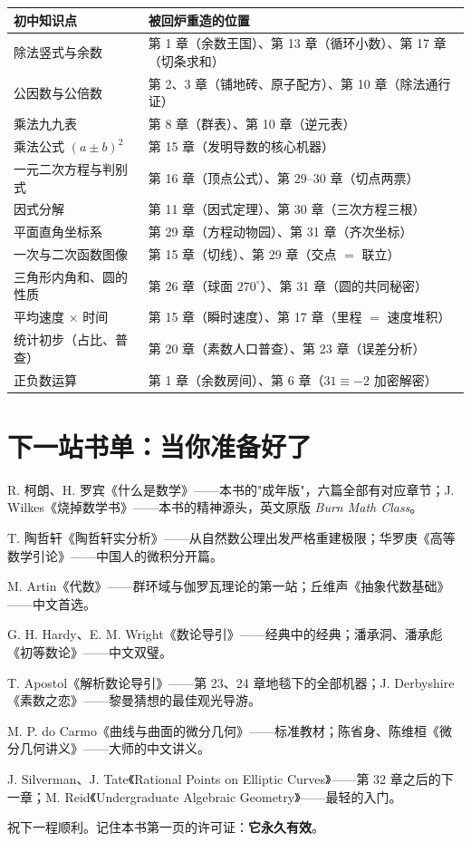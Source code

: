 \begin{center}
\begin{longtable}{p{} p{}}
\toprule
初中知识点 & 被回炉重造的位置 \\
\midrule
\endhead
除法竖式与余数 & 第 1 章（余数王国）、第 13 章（循环小数）、第 17 章（切条求和） \\
公因数与公倍数 & 第 2、3 章（铺地砖、原子配方）、第 10 章（除法通行证） \\
乘法九九表 & 第 8 章（群表）、第 10 章（逆元表） \\
乘法公式 $(a\pm b)^2$ & 第 15 章（发明导数的核心机器） \\
一元二次方程与判别式 & 第 16 章（顶点公式）、第 29--30 章（切点两票） \\
因式分解 & 第 11 章（因式定理）、第 30 章（三次方程三根） \\
平面直角坐标系 & 第 29 章（方程动物园）、第 31 章（齐次坐标） \\
一次与二次函数图像 & 第 15 章（切线）、第 29 章（交点 $=$ 联立） \\
三角形内角和、圆的性质 & 第 26 章（球面 $270^\circ$）、第 31 章（圆的共同秘密） \\
平均速度 $\times$ 时间 & 第 15 章（瞬时速度）、第 17 章（里程 $=$ 速度堆积） \\
统计初步（占比、普查） & 第 20 章（素数人口普查）、第 23 章（误差分析） \\
正负数运算 & 第 1 章（余数房间）、第 6 章（$31 \equiv -2$ 加密解密） \\
\bottomrule
\end{longtable}
\end{center}

\chapter{下一站书单：当你准备好了}

\begin{description}[leftmargin=2em]
  \item[通识再进一步] R. 柯朗、H. 罗宾《什么是数学》——本书的"成年版"，六篇全部有对应章节；J. Wilkes《烧掉数学书》——本书的精神源头，英文原版 \textit{Burn Math Class}。
  \item[分析（篇三的完全体）] T. 陶哲轩《陶哲轩实分析》——从自然数公理出发严格重建极限；华罗庚《高等数学引论》——中国人的微积分开篇。
  \item[代数（篇二的完全体）] M. Artin《代数》——群环域与伽罗瓦理论的第一站；丘维声《抽象代数基础》——中文首选。
  \item[数论（篇一的完全体）] G. H. Hardy、E. M. Wright《数论导引》——经典中的经典；潘承洞、潘承彪《初等数论》——中文双璧。
  \item[解析数论（篇四）] T. Apostol《解析数论导引》——第 23、24 章地毯下的全部机器；J. Derbyshire《素数之恋》——黎曼猜想的最佳观光导游。
  \item[微分几何（篇五）] M. P. do Carmo《曲线与曲面的微分几何》——标准教材；陈省身、陈维桓《微分几何讲义》——大师的中文讲义。
  \item[代数几何与椭圆曲线（篇六）] J. Silverman、J. Tate《Rational Points on Elliptic Curves》——第 32 章之后的下一章；M. Reid《Undergraduate Algebraic Geometry》——最轻的入门。
\end{description}

\vspace{2em}
\noindent 祝下一程顺利。记住本书第一页的许可证：\textbf{它永久有效}。
